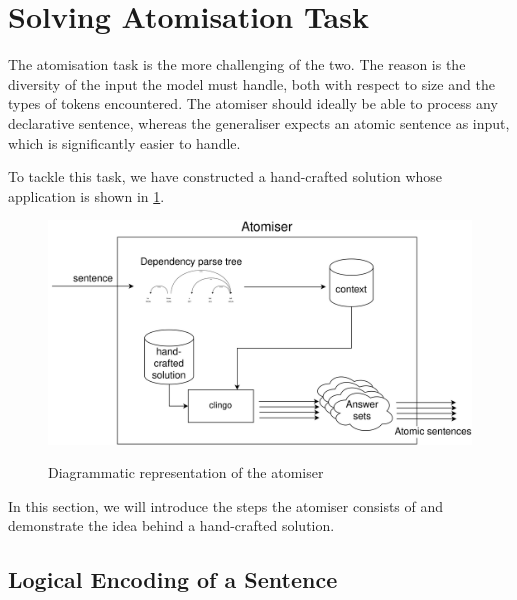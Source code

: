 \section{Solving Atomisation Task}
\label{solving-atomisation-task}

The atomisation task is the more challenging of the two.
The reason is the diversity of the input the model must handle, both with respect to size and the types of tokens encountered.
The atomiser should ideally be able to process any declarative sentence, whereas the generaliser expects an atomic sentence as input, which is significantly easier to handle. 

To tackle this task, we have constructed a hand-crafted solution whose application is shown in \ref{atomisation-diagram}.

\begin{figure}[h]
\caption{Diagrammatic representation of the atomiser}
\vspace{5pt}
\centering
\includegraphics[width=\textwidth]{solving-nlp-tasks-logically/Atomisation diagram.png}
\label{atomisation-diagram}
\end{figure}

In this section, we will introduce the steps the atomiser consists of and demonstrate the idea behind a hand-crafted solution.

\subsection{Logical Encoding of a Sentence}
\label{logical-encoding}

